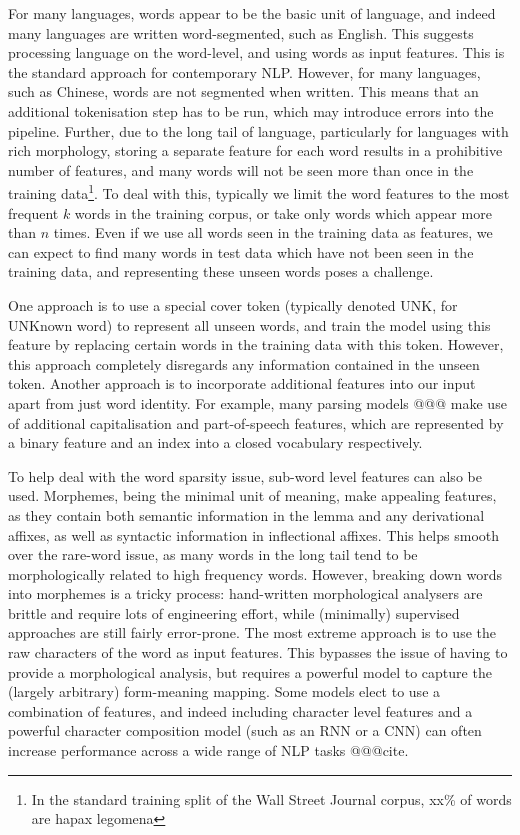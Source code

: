 For many languages, words appear to be the basic unit of language, and indeed many languages are written word-segmented, such as English. This suggests processing language on the word-level, and using words as input features. This is the standard approach for contemporary NLP. However, for many languages, such as Chinese, words are not segmented when written. This means that an additional tokenisation step has to be run, which may introduce errors into the pipeline. Further, due to the long tail of language, particularly for languages with rich morphology, storing a separate feature for each word results in a prohibitive number of features, and many words will not be seen more than once in the training data\footnote{In the standard training split of the Wall Street Journal corpus, xx\% of words are hapax legomena}. To deal with this, typically we limit the word features to the most frequent $k$ words in the training corpus, or take only words which appear more than $n$ times. Even if we use all words seen in the training data as features, we can expect to find many words in test data which have not been seen in the training data, and representing these unseen words poses a challenge.

One approach is to use a special cover token (typically denoted UNK, for UNKnown word) to represent all unseen words, and train the model using this feature by replacing certain words in the training data with this token. However, this approach completely disregards any information contained in the unseen token. Another approach is to incorporate additional features into our input apart from just word identity. For example, many parsing models @@@ make use of additional capitalisation and part-of-speech features, which are represented by a binary feature and an index into a closed vocabulary respectively. 

To help deal with the word sparsity issue, sub-word level features can also be used. Morphemes, being the minimal unit of meaning, make appealing features, as they contain both semantic information in the lemma and any derivational affixes, as well as syntactic information in inflectional affixes. This helps smooth over the rare-word issue, as many words in the long tail tend to be morphologically related to high frequency words. However, breaking down words into morphemes is a tricky process: hand-written morphological analysers are brittle and require lots of engineering effort, while (minimally) supervised approaches are still fairly error-prone. The most extreme approach is to use the raw characters of the word as input features. This bypasses the issue of having to provide a morphological analysis, but requires a powerful model to capture the (largely arbitrary) form-meaning mapping. Some models elect to use a combination of features, and indeed including character level features and a powerful character composition model (such as an RNN or a CNN) can often increase performance across a wide range of NLP tasks @@@cite.

